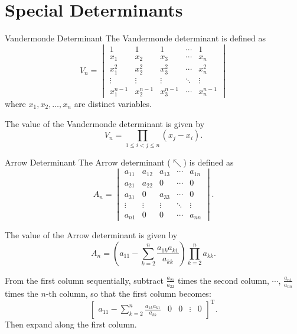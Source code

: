 \documentclass[11pt]{../../TexTemplate/elegantbook} %
\begin{document}
\section{Special Determinants} %
\begin{definition}{Vandermonde Determinant}
    The Vandermonde determinant is defined as
    \[
    V_n = \begin{vmatrix}
    1 & 1 & 1 & \cdots & 1 \\
    x_1 & x_2 & x_3 & \cdots & x_n \\
    x_1^2 & x_2^2 & x_3^2 & \cdots & x_n^2 \\
    \vdots & \vdots & \vdots & \ddots & \vdots \\
    x_1^{n-1} & x_2^{n-1} & x_3^{n-1} & \cdots & x_n^{n-1}
    \end{vmatrix}
    \]
    where \( x_1, x_2, \ldots, x_n \) are distinct variables.
\end{definition}

The value of the Vandermonde determinant is given by
\[
V_n = \prod_{1 \leq i < j \leq n} (x_j - x_i).
\]  

\begin{definition}{Arrow Determinant}
    The Arrow determinant (\(\nwarrow\)) is defined as
    \[
    A_n = \begin{vmatrix}
    a_{11} & a_{12} & a_{13} & \cdots & a_{1n} \\
    a_{21} & a_{22} & 0 & \cdots & 0 \\
    a_{31} & 0 & a_{33} & \cdots & 0 \\
    \vdots & \vdots & \vdots & \ddots & \vdots \\
    a_{n1} & 0 & 0 & \cdots & a_{nn}
    \end{vmatrix}.
    \]

    The value of the Arrow determinant is given by
    \[
    A_n = \left( a_{11}- \sum_{k=2}^{n} \frac{a_{1k}a_{k1}}{a_{kk}}  \right)\prod_{k=2}^{n} a_{kk}.
    \]
\end{definition}

From the first column sequentially, subtract \( \frac{a_{21}}{a_{22}} \) times the second column, \(\cdots\), 
\( \frac{a_{n1}}{a_{nn}} \) times the \( n \)-th column, so that the first column becomes:
\[
\begin{bmatrix}
a_{11} - \sum\limits_{k=2}^n \frac{a_{1k}a_{k1}}{a_{kk}} &
0 &
0 &
\vdots &
0
\end{bmatrix}^{\mathrm{T}}.
\]
Then expand along the first column.
\end{document}
